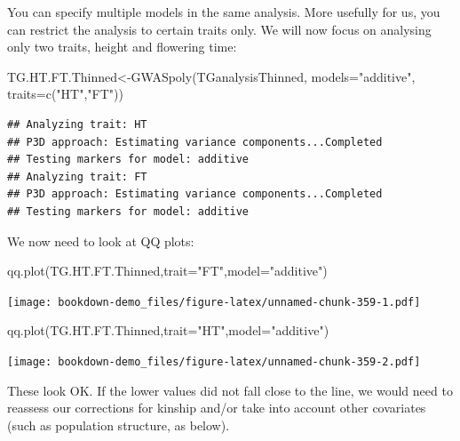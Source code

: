 \documentclass[
]{book}
\newenvironment{Shaded}{\begin{snugshade}}{\end{snugshade}}
\newcommand{\AttributeTok}[1]{\textcolor[rgb]{0.77,0.63,0.00}{#1}}
\newcommand{\FunctionTok}[1]{\textcolor[rgb]{0.00,0.00,0.00}{#1}}
\newcommand{\NormalTok}[1]{#1}
\newcommand{\OtherTok}[1]{\textcolor[rgb]{0.56,0.35,0.01}{#1}}
\newcommand{\StringTok}[1]{\textcolor[rgb]{0.31,0.60,0.02}{#1}}
\begin{document}
You can specify multiple models in the same analysis. More usefully for us, you can restrict the analysis to certain traits only. We will now focus on analysing only two traits, height and flowering time:

\begin{Shaded}
\begin{Highlighting}[]
\NormalTok{TG.HT.FT.Thinned}\OtherTok{\textless{}{-}}\FunctionTok{GWASpoly}\NormalTok{(TGanalysisThinned, }\AttributeTok{models=}\StringTok{"additive"}\NormalTok{, }\AttributeTok{traits=}\FunctionTok{c}\NormalTok{(}\StringTok{"HT"}\NormalTok{,}\StringTok{"FT"}\NormalTok{)) }
\end{Highlighting}
\end{Shaded}

\begin{verbatim}
## Analyzing trait: HT 
## P3D approach: Estimating variance components...Completed 
## Testing markers for model: additive 
## Analyzing trait: FT 
## P3D approach: Estimating variance components...Completed 
## Testing markers for model: additive
\end{verbatim}

We now need to look at QQ plots:

\begin{Shaded}
\begin{Highlighting}[]
\FunctionTok{qq.plot}\NormalTok{(TG.HT.FT.Thinned,}\AttributeTok{trait=}\StringTok{"FT"}\NormalTok{,}\AttributeTok{model=}\StringTok{"additive"}\NormalTok{)}
\end{Highlighting}
\end{Shaded}

\texttt{[image: bookdown-demo\_files/figure-latex/unnamed-chunk-359-1.pdf]}

\begin{Shaded}
\begin{Highlighting}[]
\FunctionTok{qq.plot}\NormalTok{(TG.HT.FT.Thinned,}\AttributeTok{trait=}\StringTok{"HT"}\NormalTok{,}\AttributeTok{model=}\StringTok{"additive"}\NormalTok{)}
\end{Highlighting}
\end{Shaded}

\texttt{[image: bookdown-demo\_files/figure-latex/unnamed-chunk-359-2.pdf]}

These look OK. If the lower values did not fall close to the line, we would need to reassess our corrections for kinship and/or take into account other covariates (such as population structure, as below).
\end{document}
